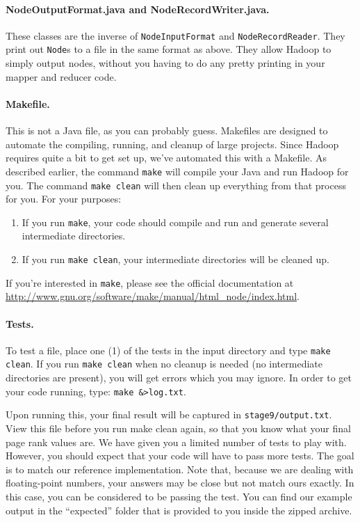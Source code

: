\documentclass[10pt]{article}
\begin{document}
\paragraph{NodeOutputFormat.java and NodeRecordWriter.java.}
These classes are the inverse of \texttt{NodeInputFormat} and \texttt{NodeRecordReader}. They print out \texttt{Node}s to a file in the same format as above. They allow Hadoop to simply output nodes, without you having to do any pretty printing in your mapper and reducer code.

\paragraph{Makefile.}
This is not a Java file, as you can probably guess. Makefiles are designed to automate the compiling, running, and cleanup of large projects. Since Hadoop requires quite a bit to get set up, we've automated this with a Makefile. As described earlier, the command \texttt{make} will compile your Java and run Hadoop for you. The command \texttt{make clean} will then clean up everything from that process for you. For your purposes:
\begin{enumerate}
	\item If you run \texttt{make}, your code should compile and run and generate several intermediate directories.
	\item If you run \texttt{make clean}, your intermediate directories will be cleaned up.
\end{enumerate}
 If you're interested in \texttt{make}, please see the official documentation at
\url{http://www.gnu.org/software/make/manual/html_node/index.html}.

\paragraph{Tests.}
To test a file, place one (1) of the tests in the input directory and type \texttt{make clean}. If you run \texttt{make clean} when no cleanup is needed (no intermediate directories are present), you will get errors which you may ignore. In order to get your code running, type: \texttt{make \&>log.txt}. 

Upon running this, your final result will be captured in \texttt{stage9/output.txt}. View this file before you run make clean again, so that you know what your final page rank values are. We have given you a limited number of tests to play with. However, you should expect that your code will have to pass more tests. The goal is to match our reference implementation. Note that, because we are dealing with floating-point numbers, your answers may be close but not match ours exactly. In this case, you can be considered to be passing the test. You can find our example output in the ``expected'' folder that is provided to you inside the zipped archive.
\end{document}
